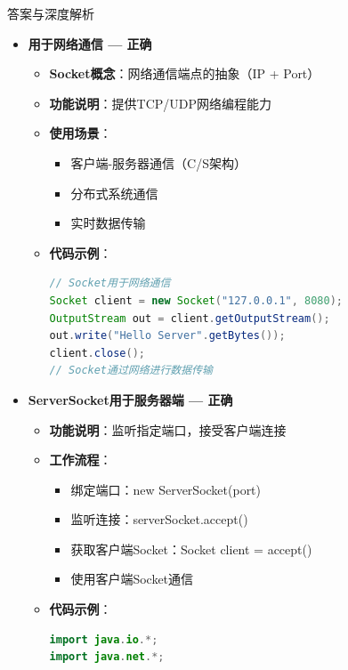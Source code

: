 \documentclass[12pt, a4paper]{ctexart}
\begin{document}
\begin{enumerate}[label=\textbf{\arabic*.}]
\begin{bluebox}{答案与深度解析}
		      \begin{itemize}[leftmargin=*, nosep, label={}]
			      \item[A] \textbf{用于网络通信 — 正确}
			            \begin{itemize}[label={}, leftmargin=*, nosep]
				            \item \textbf{Socket概念}：网络通信端点的抽象（IP + Port）
				            \item \textbf{功能说明}：提供TCP/UDP网络编程能力
				            \item \textbf{使用场景}：
				                  \begin{itemize}[label={}, nosep]
					                  \item 客户端-服务器通信（C/S架构）
					                  \item 分布式系统通信
					                  \item 实时数据传输
				                  \end{itemize}
				            \item \textbf{代码示例}：
				                  \begin{lstlisting}[language=Java]
// Socket用于网络通信
Socket client = new Socket("127.0.0.1", 8080);
OutputStream out = client.getOutputStream();
out.write("Hello Server".getBytes());
client.close();
// Socket通过网络进行数据传输
				      \end{lstlisting}
			            \end{itemize}

			      \item[B] \textbf{ServerSocket用于服务器端 — 正确}
			            \begin{itemize}[label={}, leftmargin=*, nosep]
				            \item \textbf{功能说明}：监听指定端口，接受客户端连接
				            \item \textbf{工作流程}：
				                  \begin{itemize}[label={}, nosep]
					                  \item 绑定端口：new ServerSocket(port)
					                  \item 监听连接：serverSocket.accept()
					                  \item 获取客户端Socket：Socket client = accept()
					                  \item 使用客户端Socket通信
				                  \end{itemize}
				            \item \textbf{代码示例}：
				                  \begin{lstlisting}[language=Java]
import java.io.*;
import java.net.*;


\end{lstlisting}
\end{itemize}
\end{itemize}
\end{bluebox}
\end{enumerate}
\end{document}
